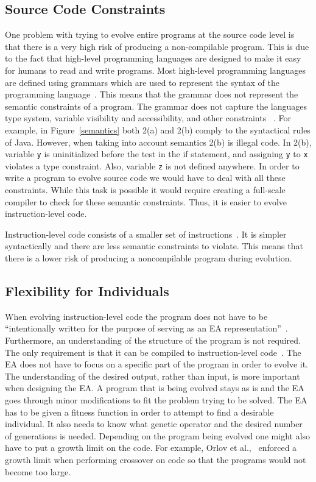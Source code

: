 \documentclass{sig-alternate}
\begin{document}
\subsection{Source Code Constraints}
One problem with trying to evolve entire programs at the source code level is that there is a very high risk of producing a non-compilable program. This is due to the fact that high-level programming languages are designed to make it easy for humans to read and write programs. Most high-level programming languages are defined using grammars which are used to represent the syntax of the programming language~\cite{Oracle:2013,Assembly:2010}. This means that the grammar does not represent the semantic constraints of a program. The grammar does not capture the languages type system, variable visibility and accessibility, and other constraints ~\cite{FINCH:2011}. For example, in Figure~\ref{semantics} both 2(a) and 2(b) comply to the syntactical rules of Java. However, when taking into account semantics 2(b) is illegal code. In 2(b), variable \texttt{y} is uninitialized before the test in the if statement, and assigning \texttt{y} to \texttt{x} violates a type constraint. Also, variable \texttt{z} is not defined anywhere.  In order to write a program to evolve source code we would have to deal with all these constraints. While this task is possible it would require creating a full-scale compiler to check for these semantic constraints. Thus, it is easier to evolve instruction-level code. \par

Instruction-level code consists of a smaller set of instructions~\cite{Assembly:2010}. It is simpler syntactically and there are less semantic constraints to violate. This means that there is a lower risk of producing a noncompilable program during evolution.

\subsection{Flexibility  for Individuals}

When evolving instruction-level code the program does not have to be ``intentionally written for the purpose of serving as an EA representation''~\cite{FINCH2:2009}. Furthermore, an understanding of the structure of the program is not required. The only requirement is that it can be compiled to instruction-level code~\cite{FINCH2:2009, Assembly:2010}. The EA does not have to focus on a specific part of the program in order to evolve it. The understanding of the desired output, rather than input, is more important when designing the EA. A program that is being evolved stays as is and the EA goes through minor modifications to fit the problem trying to be solved. The EA has to be given a fitness function in order to attempt to find a desirable individual. It also needs to know what genetic operator and the desired number of generations is needed. Depending on the program being evolved one might also have to put a growth limit on the code. For example, Orlov et al.,~\cite{FINCH:2011} enforced a growth limit when performing crossover on code so that the programs would not become too large.
\end{document}
